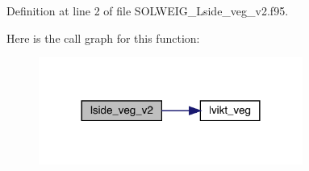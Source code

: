 Definition at line 2 of file S\+O\+L\+W\+E\+I\+G\+\_\+\+Lside\+\_\+veg\+\_\+v2.\+f95.

Here is the call graph for this function\+:\nopagebreak
\begin{figure}[H]
\begin{center}
\leavevmode
\includegraphics[width=245pt]{_s_o_l_w_e_i_g___lside__veg__v2_8f95_a5ee1707001cdd556fc8bd619efaf7610_cgraph}
\end{center}
\end{figure}
